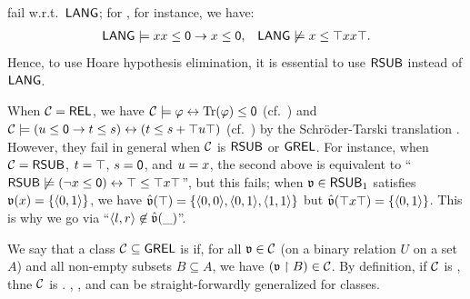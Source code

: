 \begin{remark}\label{remark: fail for LANG}
     fail w.r.t.\ $\mathsf{LANG}$; for , for instance, we have:
    \begin{align*}
        \mathsf{LANG} &\models x x \le \mathsf{0} \to x \le \mathsf{0}, & \mathsf{LANG} \not\models x \le \top x x \top.
    \end{align*}
    Hence, to use Hoare hypothesis elimination, it is essential to use $\mathsf{RSUB}$ instead of $\mathsf{LANG}$.
    \lipicsEnd
\end{remark}

\begin{remark}\label{remark: Schroder-Tarski}
    When $\algclass = \REL$, we have $\algclass \models \fml \leftrightarrow \mathrm{Tr}(\fml) \le \emp$ (cf.\ ) and $\algclass \models (\term[3] \le \emp \to \term[1] \le \term[2]) \leftrightarrow (\term[1] \le \term[2] \union \top \term[3] \top)$ (cf.\ )
    by the Schr{\"o}der-Tarski translation \cite[XXXII.]{tarskiCalculusRelations1941}\cite[p.\ 390, 391]{givantCalculusRelations2017}.
    However, they fail in general when $\algclass$ is $\mathsf{RSUB}$ or $\mathsf{GREL}$.
    For instance, when $\algclass = \RSUB$, $\term[1] = \top$, $\term[2] = \emp$, and $\term[3] = x$,
    the second above is equivalent to ``$\mathsf{RSUB} \not\models (\lnot x \le \mathsf{0}) \leftrightarrow \top \le \top x \top$'',
    but this fails;
    when $\mathfrak{v} \in \mathsf{RSUB}_{1}$ satisfies $\mathfrak{v}(x) = \{\langle0, 1\rangle\}$,
    we have $\hat{\mathfrak{v}}(\top) = \{\langle0, 0\rangle, \langle0, 1\rangle, \langle1, 1\rangle\}$ but $\hat{\mathfrak{v}}(\top x \top) = \{\langle0, 1\rangle\}$.
    This is why we go via ``$\langle l, r\rangle \not\in \hat{\mathfrak{v}}(\_)$''.
    \lipicsEnd
\end{remark}

\begin{remark}
We say that a class $\algclass \subseteq \GREL$ is \intro*{} if, for all $\val \in \algclass$ (on a binary relation $U$ on a set $A$) and all  non-empty subsets $B \subseteq A$, we have $(\val \restriction B) \in \algclass$.
By definition, if $\algclass$ is , thne $\algclass$ is .
, , and  can be straight-forwardly generalized for  classes.
\lipicsEnd
\end{remark}

